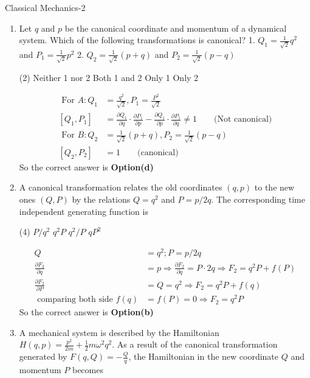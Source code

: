 \begin{abox}
	Classical Mechanics-2
	\end{abox}
\begin{enumerate}
	\item Let $q$ and $p$ be the canonical coordinate and momentum of a dynamical system. Which of the following transformations is canonical?
	1. $Q_{1}=\frac{1}{\sqrt{2}} q^{2}$ and $P_{1}=\frac{1}{\sqrt{2}} p^{2}$
	2. $Q_{2}=\frac{1}{\sqrt{2}}(p+q)$ and $P_{2}=\frac{1}{\sqrt{2}}(p-q)$

	 \begin{tasks}(2)
		\task[\textbf{a.}] Neither 1 nor 2
		\task[\textbf{b.}]Both 1 and 2
		\task[\textbf{c.}] Only 1
		\task[\textbf{d.}] Only 2
	\end{tasks}
\begin{answer}
	$$
	\begin{aligned}
	\text { For } A: Q_{1}&=\frac{q^{2}}{\sqrt{2}}, P_{1}=\frac{P^{2}}{\sqrt{2}}\\
	\left[Q_{1}, P_{1}\right]&=\frac{\partial Q_{1}}{\partial q} \cdot \frac{\partial P_{1}}{\partial p}-\frac{\partial Q_{1}}{\partial p} \cdot \frac{\partial P_{1}}{\partial q} \neq 1\qquad \text{(Not canonical)}\\
	\text { For } B: Q_{2}&=\frac{1}{\sqrt{2}}(p+q), P_{2}=\frac{1}{\sqrt{2}}(p-q)\\
	\left[Q_{2}, P_{2}\right]&=1\qquad
	\text{(canonical)}
\end{aligned}
$$
So the correct answer is \textbf{Option(d)}
\end{answer}
	\item A canonical transformation relates the old coordinates $(q, p)$ to the new ones $(Q, P)$ by the relations $Q=q^{2}$ and $P=p / 2 q$. The corresponding time independent generating function is
{}
	 \begin{tasks}(4)
		\task[\textbf{a.}]$P / q^{2}$
		\task[\textbf{b.}] $q^{2} P$
		\task[\textbf{c.}]$q^{2} / P$
		\task[\textbf{d.}] $q P^{2}$ 
	\end{tasks}
\begin{answer}
	$$
	\begin{aligned}
	Q&=q^{2} ; P=p / 2 q\\
	\frac{\partial F_{2}}{\partial q}&=p \Rightarrow \frac{\partial F_{2}}{\partial q}=P \cdot 2 q \Rightarrow F_{2}=q^{2} P+f(P)\\
	\frac{\partial F_{2}}{\partial P}&=Q=q^{2} \Rightarrow F_{2}=q^{2} P+f(q)\\
	\text { comparing both side } f(q)&=f(P)=0 \Rightarrow F_{2}=q^{2} P
\end{aligned}
$$
So the correct answer is \textbf{Option(b)}
\end{answer}
	\item A mechanical system is described by the Hamiltonian $H(q, p)=\frac{p^{2}}{2 m}+\frac{1}{2} m \omega^{2} q^{2}$. As a result of the canonical transformation generated by $F(q, Q)=-\frac{Q}{q}$, the Hamiltonian in the new coordinate $Q$ and momentum $P$ becomes


\end{enumerate}
